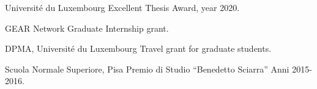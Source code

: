 {%
	Universit\'e du Luxembourg}
{%
	Excellent Thesis Award, year 2020.}
{}

{%
	GEAR Network}
{%
	Graduate Internship grant.}
{}

{%
	DPMA, Universit\'e du Luxembourg}
{%
	Travel grant for graduate students.}
{}

{%
	Scuola Normale Superiore, Pisa}
{%
	Premio di Studio ``Benedetto Sciarra'' Anni 2015-2016.}
{}